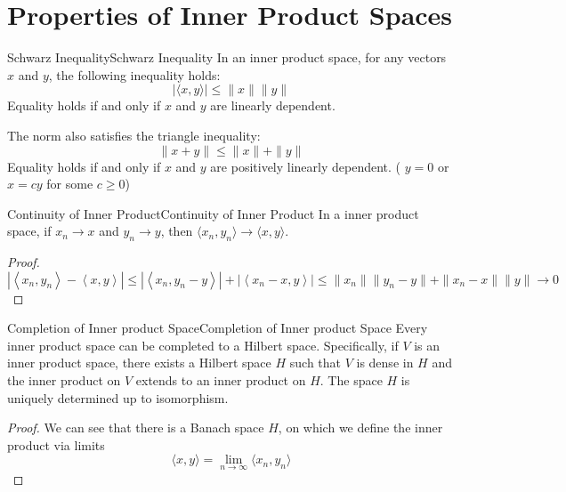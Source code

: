 \documentclass[../main.tex]{subfiles}
\begin{document}
\section{Properties of Inner Product Spaces}

\begin{lemma}{Schwarz Inequality}{Schwarz Inequality}
	In an inner product space, for any vectors $x$ and $y$, the following inequality holds:
	\begin{equation}
		|\langle x, y \rangle| \leq \|x\| \|y\|
	\end{equation}
	Equality holds if and only if $x$ and $y$ are linearly dependent.

	The norm also satisfies the triangle inequality:
	\begin{equation}
		\|x + y\| \leq \|x\| + \|y\|
	\end{equation}
	Equality holds if and only if $x$ and $y$ are positively linearly dependent. ( $y=0$ or $x=cy$ for some $c\geq 0$)
\end{lemma}

\begin{lemma}{Continuity of Inner Product}{Continuity of Inner Product}
	In a inner product space, if $x_n \rightarrow x$ and $y_n \rightarrow y$, then $\langle x_n, y_n \rangle \rightarrow \langle x, y \rangle$.
\end{lemma}
\begin{proof}
\begin{equation*}
	\left|\left<x_n,y_n\right> - \left<x,y\right>\right| \leq \left|\left<x_n,y_n - y\right>\right| + \left|\left<x_n - x,y\right>\right| \leq \|x_n\|\|y_n - y\| + \|x_n - x\|\|y\| \rightarrow 0
\end{equation*}
\end{proof}

\begin{theorem}{Completion of Inner product Space}{Completion of Inner product Space}
	Every inner product space can be completed to a Hilbert space. Specifically, if $V$ is an inner product space, there exists a Hilbert space $H$ such that $V$ is dense in $H$ and the inner product on $V$ extends to an inner product on $H$. The space $H$ is uniquely determined up to isomorphism.
\end{theorem}
\begin{proof}
We can see that there is a Banach space $H$, on which we define the inner product via limits
\begin{equation*}
	\langle x, y \rangle = \lim_{n \to \infty} \langle x_n, y_n \rangle
\end{equation*}
\end{proof}
\end{document}
